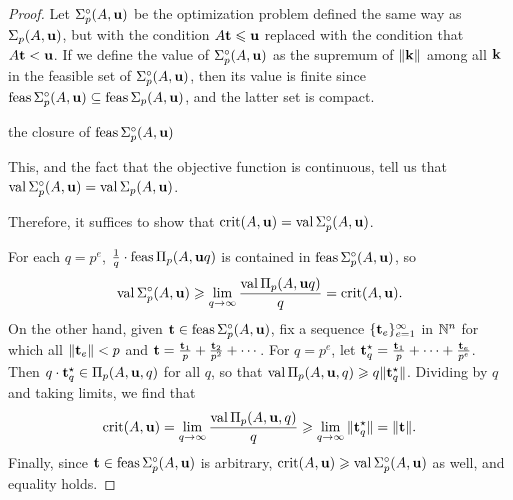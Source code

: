 \documentclass[11pt]{amsart}
\begin{document}
\begin{proof}
Let $\Sigma^\circ_p(A, \mathbf{u})$ be the optimization problem defined the same way as $\Sigma_p(A, \mathbf{u})$, but with the condition $A \mathbf{t} \leqslant \mathbf{u}$ replaced with the condition that $A \mathbf{t} < \mathbf{u}$.  If we define the value of $\Sigma^\circ_p(A, \mathbf{u})$ as the supremum of $\| \mathbf{k} \|$ among all $\mathbf{k}$ in the feasible set of $\Sigma^\circ_p(A, \mathbf{u})$, then its value is finite since $\operatorname{feas} \Sigma^\circ_p(A, \mathbf{u}) \subseteq \operatorname{feas} \Sigma_p(A, \mathbf{u})$, and the latter set is compact.

the closure of $\operatorname{feas}\Sigma^\circ_p(A, \mathbf{u})$ 



This, and the fact that the objective function is continuous, tell us that $\operatorname{val} \Sigma^\circ_p(A, \mathbf{u}) = \operatorname{val} \Sigma_p(A, \mathbf{u})$.


Therefore, it suffices to show that $\operatorname{crit}(A,\mathbf{u}) = \operatorname{val} \Sigma^\circ_p(A,\mathbf{u})$. 

For each $q=p^e$,  $\frac{1}{q}\cdot\operatorname{feas}\Pi_p(A,\mathbf{u}q)$ is contained in $\operatorname{feas} \Sigma^\circ_p(A,\mathbf{u})$, so 
\[
\operatorname{val}\Sigma^\circ_p(A,\mathbf{u}) \geqslant \displaystyle \lim_{q\to \infty}\frac{\operatorname{val}\Pi_p(A,\mathbf{u}q)}{q} = \operatorname{crit}(A,\mathbf{u}).
 \]
On the other hand, given $\mathbf{t} \in \operatorname{feas}\Sigma^\circ_p(A, \mathbf{u})$, fix a sequence $\{ \mathbf{t}_e \}_{e=1}^\infty$ in $\mathbb{N}^n$ for which all $\| \mathbf{t}_e \| < p$ and 
$\mathbf{t} = \frac{\mathbf{t}_1}{p} +\frac{\mathbf{t}_2}{p^2}+\cdots$.  For $q = p^e$, let 
 $\mathbf{t}^\star_q = \frac{\mathbf{t}_1}{p} + \cdots + \frac{\mathbf{t}_e}{p^e}$.  Then $q \cdot \mathbf{t}^\star_q \in \Pi_p(A, \mathbf{u}, q)$ for all $q$, so that $\operatorname{val} \Pi_p(A, \mathbf{u}, q) \geqslant q \| \mathbf{t}^\star_q \|$. 
 Dividing by $q$ and taking limits, we find that  
 \[
\operatorname{crit}(A,\mathbf{u}) = \lim_{q\to \infty} \frac{\operatorname{val} \Pi_p(A, \mathbf{u}, q)}{q} \geqslant \lim_{q \to \infty}   \| \mathbf{t}^\star_q \| = \| \mathbf{t} \|.
 \]
Finally, since $\mathbf{t} \in \operatorname{feas} \Sigma^\circ_p(A, \mathbf{u})$ is arbitrary, $\operatorname{crit}(A, \mathbf{u}) \geqslant \operatorname{val} \Sigma^\circ_p(A, \mathbf{u})$ as well, and equality holds. 
\end{proof}
\end{document}
